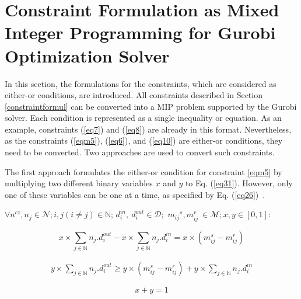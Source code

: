     
    \section{Constraint Formulation as Mixed Integer Programming for Gurobi Optimization Solver}
    
    In this section, the formulations for the constraints, which are considered as either-or conditions, are introduced. All constraints described in Section \ref{constraintformul} can be converted into a MIP problem supported by the Gurobi solver.
    Each condition is represented as a single inequality or equation. As an example, constraints (\ref{eq7}) and (\ref{eq8}) are already in this format. 
    Nevertheless, as the constraints (\ref{eqm5}), (\ref{eq6}), and (\ref{eq10}) are either-or conditions, they need to be converted. Two approaches are used to convert such constraints. 
    
    The first approach formulates the either-or condition for constraint \eqref{eqm5} by multiplying two different binary variables $x$ and $y$ to Eq. (\ref{eq31}). However, only one of these variables can be one at a time, as specified by Eq. (\ref{eq26})~\cite{askaripoor2023designer}.\newline
    
         $\forall n^{cz}, n_j \in\mathcal{N}; i, j (i \neq j) \in \mathbb{N}$; $d_i^{in},~d_i^{out}\in\mathcal{D};$ ${m_{ij}}^{s}, m_{ij}^{r}~\in\mathcal{M}; x, y \in [0, 1]$:\newline 
         
      \begin{equation}	
    	x \times \sum_{j \in \mathbb{N} } n_{j}.d_i^{out} - x \times \sum_{j \in \mathbb{N} } n_{j}.d_i^{in}  = x \times ({m_{ij}^{s}} - m_{ij}^{r})
    	\label{eq31}
    \end{equation}
    
    \begin{equation*}	
    \begin{split}
    	y \times \sum_{j \in \mathbb{N} } n_{j}.d_i^{out} \geq y\times({m_{ij}^{s}} - m_{ij}^{r}) + y\times \sum_{j \in \mathbb{N} } n_{j}.d_i^{in} 
    	\label{eq009}
    \end{split}
    \end{equation*}
    
    \begin{equation}
    	 x + y = 1 
    	\label{eq26}
    \end{equation}
    
